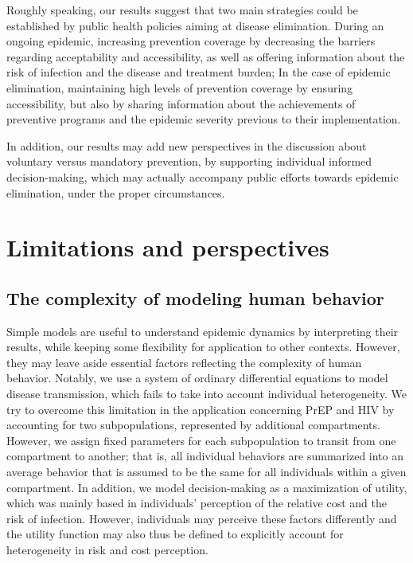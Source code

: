 Roughly speaking, our results suggest that two main strategies could be established by public health policies aiming at disease elimination. During an ongoing epidemic, increasing prevention coverage by decreasing the barriers regarding acceptability and accessibility, as well as offering information about the risk of infection and the disease and treatment burden; In the case of epidemic elimination, maintaining high levels of prevention coverage by ensuring accessibility, but also by sharing information about  the achievements of preventive programs and the epidemic severity previous to their implementation. 

In addition, our results may add new perspectives in the discussion about voluntary versus mandatory prevention, by supporting individual informed decision-making, which may actually accompany public efforts towards epidemic elimination, under the proper circumstances.

\section{Limitations and perspectives}
\subsection{The complexity of modeling human behavior}
Simple models are useful to understand epidemic dynamics by interpreting their results, while keeping some flexibility for application to other contexts. However, they may leave aside essential factors reflecting the complexity of human behavior. Notably, we use a system of ordinary differential equations to model disease transmission, which fails to take into account individual heterogeneity. We try to overcome this limitation in the application concerning PrEP and HIV by accounting for two subpopulations, represented by additional compartments. However, we assign fixed parameters for each subpopulation to transit from one compartment to another; that is, all individual behaviors are summarized into an average behavior that is assumed to be the same for all individuals within a given compartment. In addition, we model decision-making as a maximization of utility, which was mainly based in individuals' perception of the relative cost and the risk of infection. However, individuals may perceive these factors differently and the utility function may also thus be defined to explicitly account for heterogeneity in risk and cost perception. 

